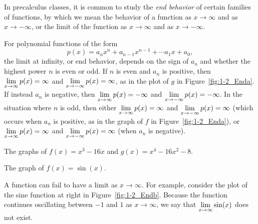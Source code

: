 In precalculus classes, it is common to study the \emph{end behavior} of certain families of functions, by which we mean the behavior of a function as $x \to \infty$ and as $x \to -\infty$, or the limit of the function as $x \to \infty$ and as $x \to -\infty$.

For polynomial functions of the form 
\[ p(x) = a_n x^n + a_{n-1}x^{n-1} + \cdots a_1 x + a_0,\] 
the limit at infinity, or end behavior, depends on the sign of $a_n$ and whether the highest power $n$ is even or odd.  If $n$ is even and $a_n$ is positive, then $\displaystyle \lim_{x \to \infty} p(x) = \infty$ and $\displaystyle \lim_{x \to -\infty} p(x) = \infty$, as in the plot of $g$ in Figure~\ref{fig:1-2_Enda}.  If instead $a_n$ is negative, then $\displaystyle \lim_{x \to \infty} p(x) = -\infty$ and $\displaystyle \lim_{x \to -\infty} p(x) = -\infty$.  In the situation where $n$ is odd, then either $\displaystyle \lim_{x \to \infty} p(x) = \infty$ and $\displaystyle \lim_{x \to -\infty} p(x) = \infty$ (which occurs when $a_n$ is positive, as in the graph of $f$ in Figure~\ref{fig:1-2_Enda}), or $\displaystyle \lim_{x \to \infty} p(x) = \infty$ and $\displaystyle \lim_{x \to -\infty} p(x) = \infty$ (when $a_n$ is negative).

\begin{marginfigure}[-7cm] %
\caption{The graphs of $f(x) = x^3 - 16x$ and $g(x) = x^4 - 16x^2-8$.}\label{fig:1-2_Enda}
\end{marginfigure}

\begin{marginfigure} %
\caption{The graph of $f(x) =\sin(x)$.}\label{fig:1-2_Endb}
\end{marginfigure}

A function can fail to have a limit as $x \to \infty$.  For example, consider the plot of the sine function at right in Figure~\ref{fig:1-2_Endb}.  Because the function continues oscillating between $-1$ and $1$ as $x \to \infty$, we say that $\displaystyle \lim_{x \to \infty} \sin(x)$ does not exist.

